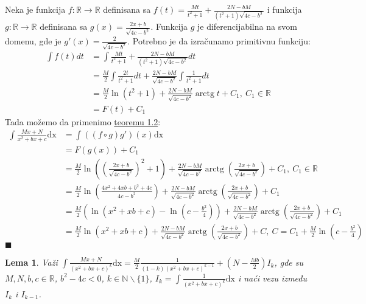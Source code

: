 \documentclass{article}
\newtheorem{lema}{Lema}[section]
\DeclareMathOperator{\arctg}{arctg}
\begin{document}
Neka je funkcija $f:\mathbb{R}\longrightarrow\mathbb{R}$ definisana sa
$f(t)=\frac{Mt}{t^2+1}+\frac{2N-bM}{(t^2+1)\sqrt{4c-b^2}}$ i funkcija $g:\mathbb{R}\longrightarrow\mathbb{R}$
definisana sa $g(x)=\frac{2x+b}{\sqrt{4c-b^2}}$. Funkcija $g$ je diferencijabilna na svom domenu, gde je $g'(x)=\frac{2}{\sqrt{4c-b^2}}$.
Potrebno je da izračunamo primitivnu funkciju:
\begin{align*}
    \int f(t)dt & =\int \frac{Mt}{t^2+1}+\frac{2N-bM}{(t^2+1)\sqrt{4c-b^2}}dt                          \\
                & =\frac{M}{2}\int \frac{2t}{t^2+1}dt+\frac{2N-bM}{\sqrt{4c-b^2}}\int\frac{1}{t^2+1}dt \\
                & =\frac{M}{2}\ln(t^2+1)+\frac{2N-bM}{\sqrt{4c-b^2}}\arctg{t}+C_1,\ C_1\in\mathbb{R}   \\
                & =F(t)+C_1
\end{align*}
Tada možemo da primenimo \hyperref[teorema_1.2]{teoremu 1.2}:
\begin{align*}
    \int \frac{Mx+N}{x^2+bx+c}\text{dx} & = \int ((f\circ g) g')(x)\text{dx}                                                                                                         \\
                                        & = F(g(x)) + C_1                                                                                                                            \\
                                        & = \frac{M}{2}\ln((\frac{2x+b}{\sqrt{4c-b^2}})^2+1)+\frac{2N-bM}{\sqrt{4c-b^2}}\arctg({\frac{2x+b}{\sqrt{4c-b^2}}})+ C_1,\ C_1\in\mathbb{R} \\
                                        & = \frac{M}{2}\ln(\frac{4x^2+4xb+b^2+4c}{4c-b^2})+\frac{2N-bM}{\sqrt{4c-b^2}}\arctg({\frac{2x+b}{\sqrt{4c-b^2}}})+ C_1                      \\
                                        & = \frac{M}{2}(\ln(x^2+xb+c)-\ln(c-\frac{b^2}{4}))+\frac{2N-bM}{\sqrt{4c-b^2}}\arctg({\frac{2x+b}{\sqrt{4c-b^2}}})+ C_1                     \\
                                        & = \frac{M}{2}\ln(x^2+xb+c)+\frac{2N-bM}{\sqrt{4c-b^2}}\arctg({\frac{2x+b}{\sqrt{4c-b^2}}})+ C,\ C=C_1+ \frac{M}{2}\ln(c-\frac{b^2}{4})
\end{align*}
\null\hfill $\blacksquare$\par

\begin{lemabox}
    \label{lema_1.1.4}
    \begin{lema}
        Važi $\displaystyle\int \frac{Mx+N}{(x^2+bx+c)^k}\text{dx}=\frac{M}{2}\frac{1}{(1-k)(x^2+bx+c)^{k-1}}+(N-\frac{Mb}{2})I_k$, gde su $M,N,b,c\in\mathbb{R}$, $b^2 - 4c < 0$, $k\in\mathbb{N}\backslash\{1\}$,
        $\displaystyle I_k=\int\frac{1}{(x^2+bx+c)^k}\text{dx}$ i naći vezu između $I_k$ i $I_{k-1}$.
    \end{lema}
\end{lemabox}
\end{document}
